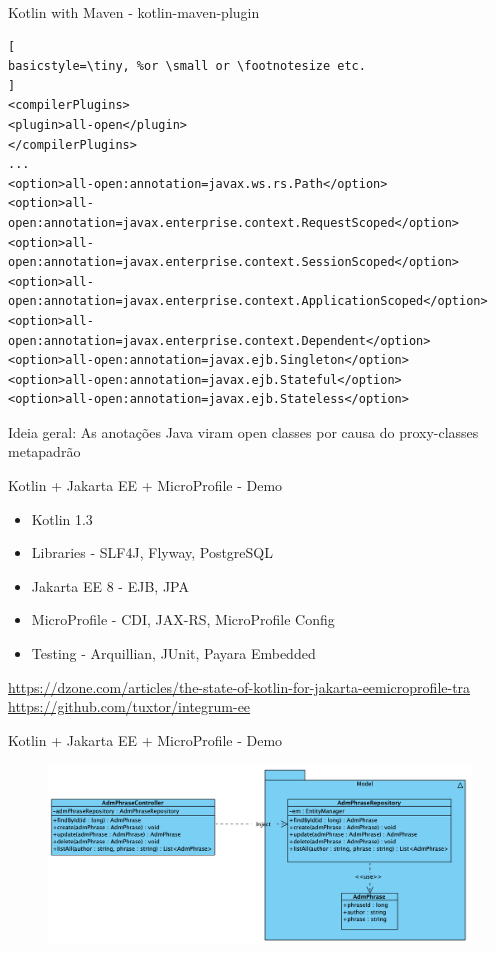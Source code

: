 \documentclass[aspectratio=169]{beamer}
\begin{document}
\begin{frame}[fragile]{Kotlin with Maven - kotlin-maven-plugin}
\begin{lstlisting}[
basicstyle=\tiny, %or \small or \footnotesize etc.
]
<compilerPlugins>
<plugin>all-open</plugin>
</compilerPlugins>
...
<option>all-open:annotation=javax.ws.rs.Path</option>
<option>all-open:annotation=javax.enterprise.context.RequestScoped</option>
<option>all-open:annotation=javax.enterprise.context.SessionScoped</option>
<option>all-open:annotation=javax.enterprise.context.ApplicationScoped</option>
<option>all-open:annotation=javax.enterprise.context.Dependent</option>
<option>all-open:annotation=javax.ejb.Singleton</option>
<option>all-open:annotation=javax.ejb.Stateful</option>
<option>all-open:annotation=javax.ejb.Stateless</option>
\end{lstlisting}

Ideia geral: As anotações Java viram open classes por causa do proxy-classes metapadrão
\end{frame}


\begin{frame}{Kotlin + Jakarta EE + MicroProfile  - Demo}

\begin{itemize}
	\item Kotlin 1.3
	\item Libraries - SLF4J, Flyway, PostgreSQL
	\item Jakarta EE 8 - EJB, JPA
	\item MicroProfile - CDI, JAX-RS, MicroProfile Config
	\item Testing - Arquillian, JUnit, Payara Embedded
\end{itemize}


\normalsize  \url{https://dzone.com/articles/the-state-of-kotlin-for-jakarta-eemicroprofile-tra}\\
\normalsize  \url{https://github.com/tuxtor/integrum-ee}
\end{frame}

\begin{frame}{Kotlin + Jakarta EE + MicroProfile  - Demo}
\begin{figure}
	\centering
	\includegraphics[width=\linewidth]{Images/integrum-ee}
\end{figure}
\end{frame}
\end{document}
